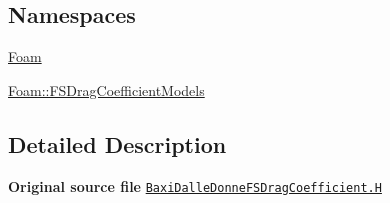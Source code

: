 \subsection*{Namespaces}
\begin{DoxyCompactItemize}
\item 
 \hyperlink{namespaceFoam}{Foam}
\item 
 \hyperlink{namespaceFoam_1_1FSDragCoefficientModels}{Foam\+::\+F\+S\+Drag\+Coefficient\+Models}
\end{DoxyCompactItemize}


\subsection{Detailed Description}
{\bfseries Original source file} \href{../../../home/carlo/data/GeN-Foam/GeN-Foam_ffn/GeN-Foam/GeN-Foam/classes/thermalHydraulics/src/physicsModels/dragModels/FSDragCoefficientModels/BaxiDalleDonne/BaxiDalleDonneFSDragCoefficient.H}{\tt Baxi\+Dalle\+Donne\+F\+S\+Drag\+Coefficient.\+H} 